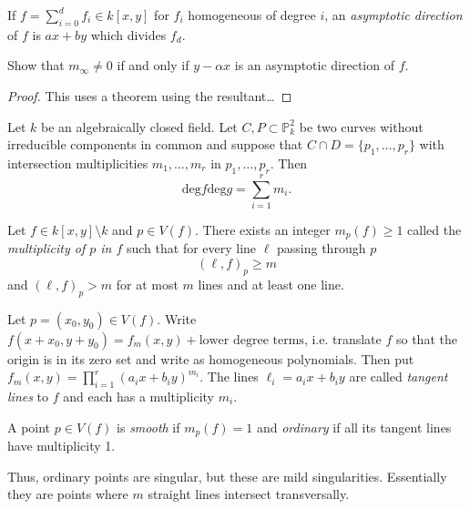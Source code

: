 \begin{exercise}
\label{exercise-asymptotic-direction}
If $f=\sum_{i=0}^df_i \in k[x,y]$ for $f_i$ homogeneous of degree $i$,
an {\it asymptotic direction} of $f$ is $ax+by$
which divides $f_d$.

Show that  $m_\infty \neq 0$ if and only if $y-\alpha x$
is an asymptotic direction of $f$.
\end{exercise}

\begin{proof}
This uses a theorem using the resultant…
\end{proof}

\begin{theorem}[Bézout]
\label{theorem-bezout}
Let $k$ be an algebraically closed field.
Let  $C,P \subset \mathbb{P}_k^2$ be two curves without
irreducible components in common
and suppose that $C \cap D= \{p_1,…,p_r\}$ 
with intersection multiplicities  $m_1,…,m_r$ 
in $p_1,…,p_r$.
Then
$$
\text{deg}f\text{deg}g=\sum_{i=1}^r m_i.
$$
\end{theorem}


\begin{proposition}
\label{proposition-multiplicity-point}
Let $f \in k[x,y]\setminus k$ and $p \in V(f)$.
There exists an integer $m_p(f)\geq 1$ called
the {\it multiplicity of $p$ in $f$} 
such that for every line $\ell$ passing through  $p$
 $$
(\ell,f)_p \geq m
$$
and $(\ell,f)_p>m$ for at most $m$ lines and at least one line.
\end{proposition}

\begin{definition}
\label{definition-tangent-line}
Let $p=(x_0,y_0) \in V(f)$.
Write $f(x+x_0,y+y_0)=f_m(x,y)+\text{lower degree terms} $, 
i.e. translate $f$ so that the origin is in its zero set
and write as homogeneous polynomials.
Then put $f_m(x,y)=\prod_{i=1}^r(a_ix+b_iy)^{m_i}$.
The lines $\ell_i=a_ix+b_iy$ are called
{\it tangent lines} to $f$ and each has a multiplicity $m_i$.
\end{definition}

\begin{definition}
\label{definition-smooth-ordinary-point-on-curve}
A point $p \in V(f)$ is {\it smooth} if $m_p(f)=1$
and  {\it ordinary} if all its tangent lines have multiplicity 1.
\end{definition}

\noindent
Thus, ordinary points are singular,
but these are mild singularities.
Essentially they are points where $m$
straight lines intersect transversally.

